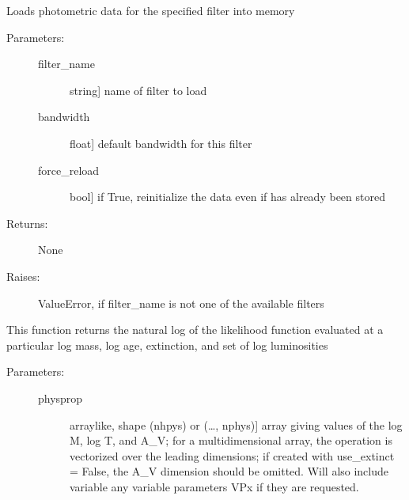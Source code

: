 \documentclass[letterpaper,10pt,english]{sphinxmanual}
\begin{document}
\begin{fulllineitems}
\begin{fulllineitems}
\begin{description}
\end{description}

\end{fulllineitems}


\begin{fulllineitems}
\label{\detokenize{cluster_slug:slugpy.cluster_slug.cluster_slug.load_data}}
Loads photometric data for the specified filter into memory
\begin{description}
\item[{Parameters:}] \leavevmode\begin{description}
\item[{filter\_name}] \leavevmode{[}string{]}
name of filter to load

\item[{bandwidth}] \leavevmode{[}float{]}
default bandwidth for this filter

\item[{force\_reload}] \leavevmode{[}bool{]}
if True, reinitialize the data even if has already been
stored

\end{description}

\item[{Returns:}] \leavevmode
None

\item[{Raises:}] \leavevmode
ValueError, if filter\_name is not one of the available
filters

\end{description}

\end{fulllineitems}


\begin{fulllineitems}
\label{\detokenize{cluster_slug:slugpy.cluster_slug.cluster_slug.logL}}
This function returns the natural log of the likelihood
function evaluated at a particular log mass, log age,
extinction, and set of log luminosities
\begin{description}
\item[{Parameters:}] \leavevmode\begin{description}
\item[{physprop}] \leavevmode{[}arraylike, shape (nhpys) or (…, nphys){]}
array giving values of the log M, log T, and A\_V; for a
multidimensional array, the operation is vectorized over
the leading dimensions; if created with use\_extinct =
False, the A\_V dimension should be omitted.
Will also include variable any variable parameters VPx if
they are requested.


\end{description}
\end{description}
\end{fulllineitems}
\end{fulllineitems}
\end{document}
